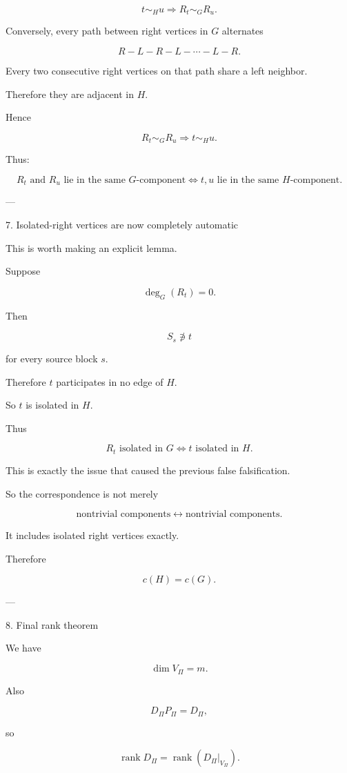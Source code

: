 \[
t\sim_Hu
\Longrightarrow
R_t\sim_GR_u.
\]

Conversely, every path between right vertices in \(G\) alternates

\[
R-L-R-L-\cdots-L-R.
\]

Every two consecutive right vertices on that path share a left neighbor.

Therefore they are adjacent in \(H\).

Hence

\[
R_t\sim_GR_u
\Longrightarrow
t\sim_Hu.
\]

Thus:

\[
\boxed{
R_t\text{ and }R_u\text{ lie in the same }G\text{-component}
\iff
t,u\text{ lie in the same }H\text{-component}.
}
\]


---

7. Isolated-right vertices are now completely automatic

This is worth making an explicit lemma.

Suppose

\[
\deg_G(R_t)=0.
\]

Then

\[
S_s\not\ni t
\]

for every source block \(s\).

Therefore \(t\) participates in no edge of \(H\).

So \(t\) is isolated in \(H\).

Thus

\[
R_t\text{ isolated in }G
\iff
t\text{ isolated in }H.
\]

This is exactly the issue that caused the previous false falsification.

So the correspondence is not merely

\[
\text{nontrivial components}\leftrightarrow\text{nontrivial components}.
\]

It includes isolated right vertices exactly.

Therefore

\[
\boxed{c(H)=c(G).}
\]


---

8. Final rank theorem

We have

\[
\dim V_\Pi=m.
\]

Also

\[
D_\Pi P_\Pi=D_\Pi,
\]

so

\[
\operatorname{rank}D_\Pi
=
\operatorname{rank}(D_\Pi|_{V_\Pi}).
\]

